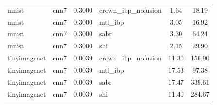 \begin{tabular}{llllcc}
mnist & cnn7 & 0.3000 & crown\_ibp\_nofusion & 1.64 & 18.19 \\
mnist & cnn7 & 0.3000 & mtl\_ibp & 3.05 & 16.92 \\
mnist & cnn7 & 0.3000 & sabr & 3.30 & 64.24 \\
mnist & cnn7 & 0.3000 & shi & 2.15 & 29.90 \\
tinyimagenet & cnn7 & 0.0039 & crown\_ibp\_nofusion & 11.30 & 156.90 \\
tinyimagenet & cnn7 & 0.0039 & mtl\_ibp & 17.53 & 97.38 \\
tinyimagenet & cnn7 & 0.0039 & sabr & 17.47 & 339.61 \\
tinyimagenet & cnn7 & 0.0039 & shi & 11.40 & 284.67 \\
\bottomrule
\end{tabular}